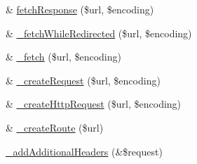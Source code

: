 \begin{DoxyCompactItemize}
\item 
\& \hyperlink{class_simple_user_agent_a8f80a93c41e5e7956ace91d133794a1d}{fetchResponse} (\$url, \$encoding)
\item 
\& \hyperlink{class_simple_user_agent_ab2268d6a93017a4b9c6f91a09a7859c1}{\_\-fetchWhileRedirected} (\$url, \$encoding)
\item 
\& \hyperlink{class_simple_user_agent_a52cd101862fafb36350e0e75bddee9a4}{\_\-fetch} (\$url, \$encoding)
\item 
\& \hyperlink{class_simple_user_agent_ac399bd23f974ae0c5633c5240beb4278}{\_\-createRequest} (\$url, \$encoding)
\item 
\& \hyperlink{class_simple_user_agent_a1232e794f352b5f6b300899992277fb0}{\_\-createHttpRequest} (\$url, \$encoding)
\item 
\& \hyperlink{class_simple_user_agent_af275887be4e67789996d9db64a04d82a}{\_\-createRoute} (\$url)
\item 
\hyperlink{class_simple_user_agent_a1ff4d1b6d409818bee5df07bc21c550f}{\_\-addAdditionalHeaders} (\&\$request)
\end{DoxyCompactItemize}

